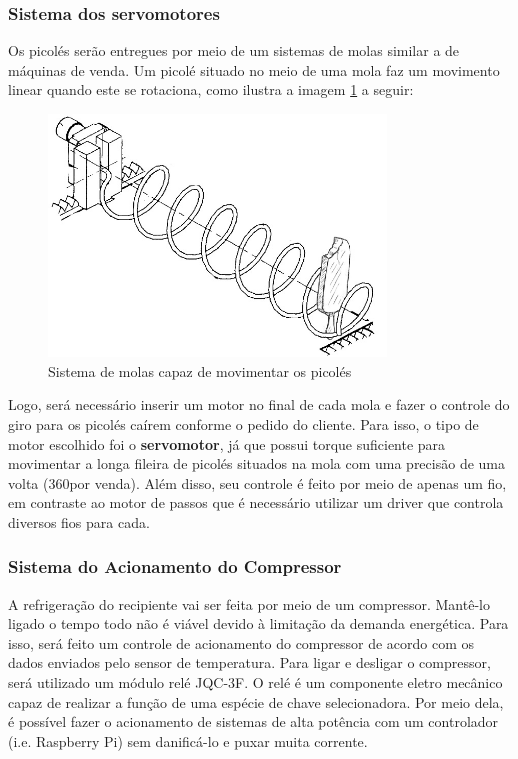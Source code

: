\subsubsection{Sistema dos servomotores}
Os picolés serão entregues por meio de um sistemas de molas similar a de máquinas de venda. Um picolé situado no meio de uma mola faz um movimento linear quando este se rotaciona, como ilustra a imagem \ref{fig:sistema_molas} a seguir:

\begin{figure}[H]
	\centering
    \includegraphics[width=0.8\textwidth]{figuras/sistema_molas}
    \caption{Sistema de molas capaz de movimentar os picolés}
    \label{fig:sistema_molas}
\end{figure}

Logo, será necessário inserir um motor no final de cada mola e fazer o controle do giro para os picolés caírem conforme o pedido do cliente. Para isso, o tipo de motor escolhido foi o \textbf{servomotor}, já que possui torque suficiente para movimentar a longa fileira de picolés situados na mola com uma precisão de uma volta (360\degree por venda). Além disso, seu controle é feito por meio de apenas um fio, em contraste ao motor de passos que é necessário utilizar um driver que controla diversos fios para cada.

\subsubsection{Sistema do Acionamento do Compressor}

A refrigeração do recipiente vai ser feita por meio de um compressor. Mantê-lo ligado o tempo todo não é viável devido à limitação da demanda energética. Para isso, será feito um controle de acionamento do compressor de acordo com os dados enviados pelo sensor de temperatura. Para ligar e desligar o compressor, será utilizado um módulo relé JQC-3F. O relé é um componente eletro mecânico capaz de realizar a função de uma espécie de chave selecionadora. Por meio dela, é possível fazer o acionamento de sistemas de alta potência com um controlador (i.e. Raspberry Pi) sem danificá-lo e puxar muita corrente.

